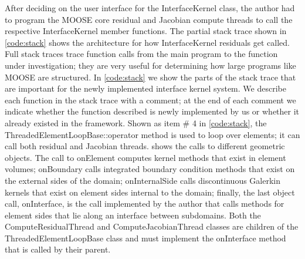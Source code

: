 After deciding on the user interface for the InterfaceKernel class, the author had to program the MOOSE core residual and Jacobian compute threads to call the respective InterfaceKernel member functions. The partial stack trace shown in \cref{code:stack} shows the architecture for how InterfaceKernel residuals get called. Full stack traces trace function calls from the main program to the function under investigation; they are very useful for determining how large programs like MOOSE are structured. In \cref{code:stack} we show the parts of the stack trace that are important for the newly implemented interface kernel system. We describe each function in the stack trace with a comment; at the end of each comment we indicate whether the function described is newly implemented by us or whether it already existed in the framework. Shown as item \# 4 in \cref{code:stack}, the ThreadedElementLoopBase::operator method is used to loop over elements; it can call both residual and Jacobian threads.  shows the calls to different geometric objects. The call to onElement computes kernel methods that exist in element volumes; onBoundary calls integrated boundary condition methods that exist on the external sides of the domain; onInternalSide calls discontinuous Galerkin kernels that exist on element sides internal to the domain; finally, the last object call, onInterface, is the call implemented by the author that calls methods for element sides that lie along an interface between subdomains. Both the ComputeResidualThread and ComputeJacobianThread classes are children of the ThreadedElementLoopBase class and must implement the onInterface method that is called by their parent.

